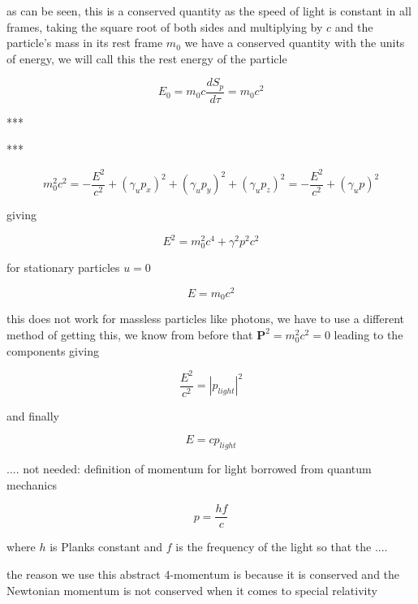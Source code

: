 as can be seen, this is a conserved quantity as the speed of light is constant in all frames, taking the square root of both sides and multiplying by $c$ and the particle's mass in its rest frame $m_0$ we have a conserved quantity with the units of energy, we will call this the rest energy of the particle

\begin{equation}
	E_0 = m_0 c \frac{dS_p}{d\tau}  = m_0 c^2
\end{equation}

***

***

\begin{equation}
	m^2_0 c^2 = - \frac{E^2}{c^2} + (\gamma_u p_x)^2 + (\gamma_u p_y)^2 + (\gamma_u p_z)^2 = - \frac{E^2}{c^2} + (\gamma_u p)^2
\end{equation}

giving

\begin{equation}
	E^2 = m_0^2c^4 +\gamma^2p^2c^2
\end{equation}

for stationary particles $u=0$

\begin{equation}
	E = m_0c^2
\end{equation}

this does not work for massless particles like photons, we have to use a different method of getting this, we know from before that $ \mathbf{P}^2 = m_0^2 c^2 = 0$ leading to the components giving

\begin{equation}
	\frac{E^2}{c^2} = |p_{light}|^2
\end{equation}

and finally

\begin{equation}
	E = c p_{light}
\end{equation}

....
not needed:
definition of momentum for light borrowed from quantum mechanics

\begin{equation}
	p = \frac{hf}{c}
\end{equation}

where $h$ is Planks constant and $f$ is the frequency of the light
so that the
....

the reason we use this abstract 4-momentum is because it is conserved and the Newtonian momentum is not conserved when it comes to special relativity

